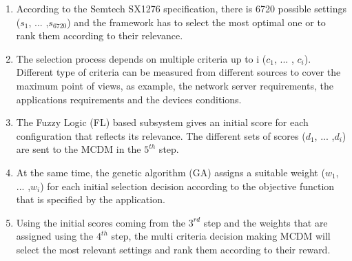 \begin{enumerate}
	\item According to the Semtech SX1276 specification, there is 6720 possible settings ($s_{1}$, ... ,$s_{6720}$) and the framework has to select the most optimal one or to rank them according to their relevance.
	\item The selection process depends on multiple criteria up to i ($c_{1}$, ... , $c_{i}$).
		Different type of criteria can be measured from different sources to cover the maximum point of views,
		as example,
		the network server requirements, the applications requirements and the devices conditions.
	\item The Fuzzy Logic (FL) based subsystem gives an initial score for each configuration that reflects its relevance.
		The different sets of scores ($d_{1}$, ... ,$d_{i}$) are sent to the \ac{MCDM} in the $5^{th}$ step.
	\item At the same time,
			the genetic algorithm (GA) \cite{alkhawlani_access_2008} assigns a suitable weight ($w_{1}$, ... ,$w_{i}$) for each initial selection decision according to the objective function that is specified by the application.
	\item Using the initial scores coming from the $3^{rd}$ step and the weights that are assigned using the $4^{th}$ step,
			the multi criteria decision making{} \ac{MCDM} will select the most relevant settings and rank them according to their reward.
\end{enumerate}
